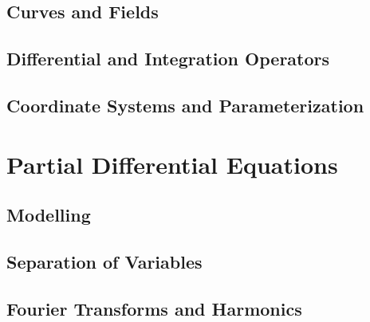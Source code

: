 \documentclass[12pt,letterpaper, openany]{book} %
\begin{document}
\chapter{Curves and Fields}


\chapter{Differential and Integration Operators}


\chapter{Coordinate Systems and Parameterization}



\part{Partial Differential Equations}

\chapter{Modelling}


\chapter{Separation of Variables}


\chapter{Fourier Transforms and Harmonics}





%


 
\newenvironment{changemargin}[1]{%
\begin{list}{}{%
\setlength{\topsep}{#1}
\setlength{\listparindent}{\parindent}%
\setlength{\itemindent}{\parindent}%
\setlength{\parsep}{\parskip}%
}%
\item[]}{\end{list}}

\begin{changemargin}{0cm}
\printindex 
\end{changemargin}

 
\end{document}
